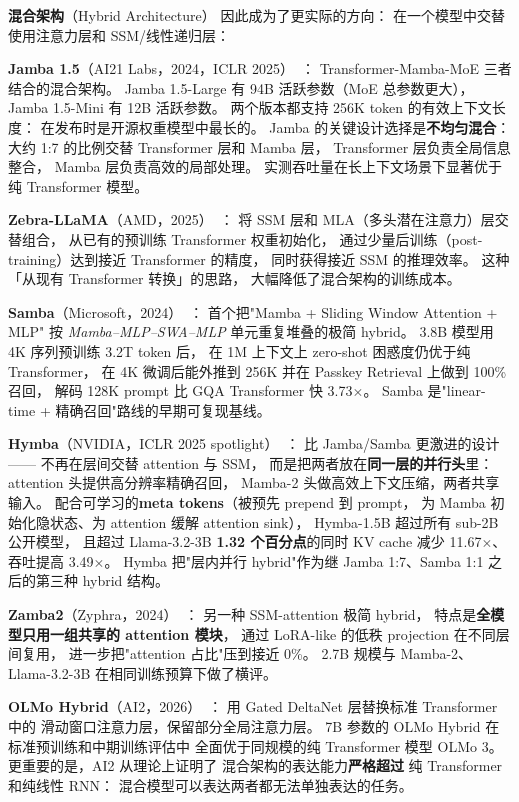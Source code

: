 \textbf{混合架构}（Hybrid Architecture）
因此成为了更实际的方向：
在一个模型中交替使用注意力层和 SSM/线性递归层：

\textbf{Jamba 1.5}（AI21 Labs，2024，ICLR 2025）~\cite{jamba2024}：
Transformer-Mamba-MoE 三者结合的混合架构。
Jamba 1.5-Large 有 94B 活跃参数（MoE 总参数更大），
Jamba 1.5-Mini 有 12B 活跃参数。
两个版本都支持 256K token 的有效上下文长度：
在发布时是开源权重模型中最长的。
Jamba 的关键设计选择是\textbf{不均匀混合}：
大约 1:7 的比例交替 Transformer 层和 Mamba 层，
Transformer 层负责全局信息整合，
Mamba 层负责高效的局部处理。
实测吞吐量在长上下文场景下显著优于纯 Transformer 模型。

\textbf{Zebra-LLaMA}（AMD，2025）~\cite{zebra2025}：
将 SSM 层和 MLA（多头潜在注意力）层交替组合，
从已有的预训练 Transformer 权重初始化，
通过少量后训练（post-training）达到接近 Transformer 的精度，
同时获得接近 SSM 的推理效率。
这种「从现有 Transformer 转换」的思路，
大幅降低了混合架构的训练成本。

\textbf{Samba}（Microsoft，2024）~\cite{samba2024}：
首个把"Mamba + Sliding Window Attention + MLP"
按 \emph{Mamba--MLP--SWA--MLP} 单元重复堆叠的极简 hybrid。
3.8B 模型用 4K 序列预训练 3.2T token 后，
在 1M 上下文上 zero-shot 困惑度仍优于纯 Transformer，
在 4K 微调后能外推到 256K 并在 Passkey Retrieval 上做到 100\% 召回，
解码 128K prompt 比 GQA Transformer 快 3.73$\times$。
Samba 是"linear-time + 精确召回"路线的早期可复现基线。

\textbf{Hymba}（NVIDIA，ICLR 2025 spotlight）~\cite{hymba2025}：
比 Jamba/Samba 更激进的设计——
不再在层间交替 attention 与 SSM，
而是把两者放在\textbf{同一层的并行头}里：
attention 头提供高分辨率精确召回，
Mamba-2 头做高效上下文压缩，两者共享输入。
配合可学习的\textbf{meta tokens}（被预先 prepend 到 prompt，
为 Mamba 初始化隐状态、为 attention 缓解 attention sink），
Hymba-1.5B 超过所有 sub-2B 公开模型，
且超过 Llama-3.2-3B \textbf{1.32 个百分点}的同时
KV cache 减少 11.67$\times$、吞吐提高 3.49$\times$。
Hymba 把"层内并行 hybrid"作为继 Jamba 1:7、Samba 1:1
之后的第三种 hybrid 结构。

\textbf{Zamba2}（Zyphra，2024）~\cite{zamba2024}：
另一种 SSM-attention 极简 hybrid，
特点是\textbf{全模型只用一组共享的 attention 模块}，
通过 LoRA-like 的低秩 projection 在不同层间复用，
进一步把"attention 占比"压到接近 0\%。
2.7B 规模与 Mamba-2、Llama-3.2-3B 在相同训练预算下做了横评。

\textbf{OLMo Hybrid}（AI2，2026）~\cite{olmo2026hybrid}：
用 Gated DeltaNet 层替换标准 Transformer 中的
滑动窗口注意力层，保留部分全局注意力层。
7B 参数的 OLMo Hybrid 在标准预训练和中期训练评估中
全面优于同规模的纯 Transformer 模型 OLMo 3。
更重要的是，AI2 从理论上证明了
混合架构的表达能力\textbf{严格超过}
纯 Transformer 和纯线性 RNN：
混合模型可以表达两者都无法单独表达的任务。

